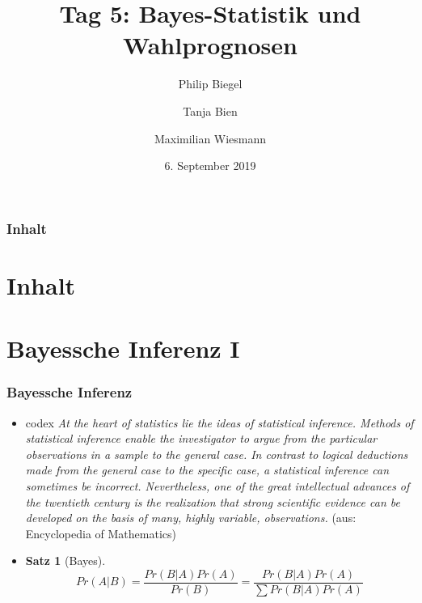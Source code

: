 \documentclass[aspectratio=169,xcolor=dvipsnames]{beamer}
\title[Bayes-Statistik \& Wahlprognosen]{\textbf{Tag 5: Bayes-Statistik und Wahlprognosen}}
\author[Philip \and Tanja \and Maximilian]{Philip Biegel \and Tanja Bien \and Maximilian Wiesmann}
\institute[]{Sommerakademie der Studienstiftung Olang - Arbeitsgruppe 4: Empirische Wahlforschung und Wahlprognosen}
\date{6. September 2019}
\newtheorem{satz}{Satz}
\begin{document}
	
\begin{frame}
\titlepage
\end{frame}

\begin{frame}
\frametitle{Inhalt}
\section[Inhalt]{Inhalt}
\tableofcontents
\end{frame}

\section{Bayessche Inferenz I}

\begin{frame}
\frametitle{Bayessche Inferenz}
\begin{itemize}
\item[]<1-> 
\begin{beamercolorbox}[sep=0.5em,wd=\textwidth,shadow=true,rounded=true]{codex}
	\textit{\glqq At the heart of statistics lie the ideas of statistical inference. Methods of statistical inference enable the investigator to argue from the particular observations in a sample to the general case. In contrast to logical deductions made from the general case to the specific case, a statistical inference can sometimes be incorrect. Nevertheless, one of the great intellectual advances of the twentieth century is the realization that strong scientific evidence can be developed on the basis of many, highly variable, observations.\grqq} (aus: Encyclopedia of Mathematics)
\end{beamercolorbox}
\item[]<2->
\begin{satz}[Bayes]
	$$Pr(A|B) = \frac{Pr(B|A)Pr(A)}{Pr(B)} = \frac{Pr(B|A)Pr(A)}{\sum Pr(B|A)Pr(A)}$$
\end{satz}
\end{itemize}
\end{frame}
\end{document}
